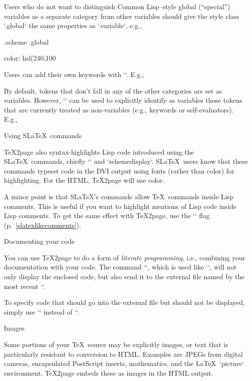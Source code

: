 {{{{{{{{\begintt
{}
\endtt

Users who do not want to distinguish Common Lisp–style
global (“special”) variables as a separate category from
other variables should give the style class `.global` the
same properties as `.variable`, e.g.,

\begintt
.scheme .global {color: hsl(240,100%
\endtt

Users can add their own keywords with `\scmkeyword`.
E.g.,

\begintt
{}
\endtt

By default, tokens that don’t fall in any of the
other categories are set as variables.  However,
`\scmvariable` can be used to explicitly identify as
variables those tokens that are currently treated as
non-variables (e.g., keywords or self-evaluators).  E.g.,

\begintt
{}
\endtt

\beginsection Using S\LaTeX\ commands

%
\TeX2page also syntax-highlights Lisp code introduced
using the S\LaTeX\ commands, chiefly
`\scheme` and `{schemedisplay}`.  S\LaTeX\ users know
that these commands typeset code in the DVI output
using fonts (rather than color) for highlighting.
For the HTML, \TeX2page will use color.

A minor point is that S\LaTeX’s commands allow \TeX\
commands inside Lisp comments.  This is useful
if you want to highlight mentions of Lisp code inside
Lisp comments.  To get the same effect with \TeX2page,
use the `\TZPslatexcomments` flag (p.~\ref{slatexlikecomments}).

\beginsection Documenting your code

%
You can use \TeX2page to do a form of {\em literate
programming}, i.e., combining your documentation with
your code.  The command `\scmdribble`, which is used
like `\scm`, will not only display the enclosed code,
but also send it to the external file named by
the most recent `\verbwritefile`.

To specify code that should go into the external file but
should not be displayed, simply use
`\verbwrite` instead of `\scmdribble`.

 Images

%
Some portions of your \TeX\ source may be explicitly
images, or text that is particularly resistant to
conversion to HTML.  Examples are JPEGs from digital cameras, encapsulated
PostScript inserts, mathematics, and the \LaTeX\
`{picture}` environment.   \TeX2page embeds these as images in the HTML
output.

}}}}}}}}}
